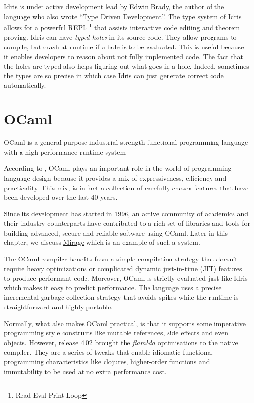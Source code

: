 Idris is under active development lead by Edwin Brady, the author
of the language who also wrote ``Type Driven Development''\citep{tdd}.
The type system of Idris allows for a powerful REPL
\footnote{Read Eval Print Loop} that assists interactive code editing
and theorem proving.
Idris can have \emph{typed holes} in its source code.
They allow programs to compile, but crash at runtime if a hole
is to be evaluated.
This is useful because it enables developers to reason about
not fully implemented code.
The fact that the holes are typed also helps figuring out what goes in
a hole. Indeed, sometimes the types are so precise in which case Idris can
just generate correct code automatically.

\section{OCaml}
OCaml is a general purpose industrial-strength functional
programming language with a high-performance runtime system

According to \citep{rwocaml}, OCaml plays an important role in the
world of programming language design because it provides a mix
of expressiveness, efficiency and practicality.
This mix, is in fact a collection of carefully chosen features
that have been developed over the last 40 years.

Since its development has started in 1996, an active community of
academics and their industry counterparts have contributed to a rich set of
libraries and tools for building advanced, secure and reliable software
using OCaml.
Later in this chapter, we discuss \hyperref[sec:mirage]{Mirage} which is
an example of such a system.

The OCaml compiler benefits from a simple
compilation strategy that doesn't require heavy optimizations or
complicated dynamic just-in-time (JIT) features to produce performant
code. Moreover, OCaml is strictly evaluated just like Idris which
makes it easy to predict performance.
The language uses  a precise incremental garbage collection strategy
that avoids spikes while the runtime is straightforward and highly
portable.

Normally, what also makes OCaml practical, is that it supports some
imperative programming style constructs like mutable references,
side effects and even objects.
However, release 4.02 brought the \emph{flambda} optimisations to the
native compiler. They are a series of tweaks
that enable idiomatic functional programming characteristics like clojures,
higher-order functions and immutability to be used at no extra
performance cost.\citep{leroy2014ocaml}

